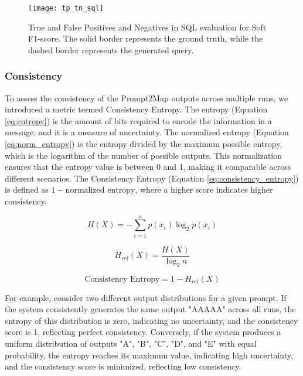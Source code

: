 \begin{figure}[htbp]
    \centering
    \texttt{[image: tp\_tn\_sql]}
    \caption{True and False Positives and Negatives in SQL evaluation for Soft F1-score. The solid border represents the ground truth, while the dashed border represents the generated query.}
    \label{fig:tp_tn_sql}
\end{figure}

\subsubsection{Consistency}

To assess the consistency of the Prompt2Map outputs across multiple runs, we introduced a metric termed Consistency Entropy. The entropy (Equation \ref{eq:entropy}) is the amount of bits required to encode the information in a message, and it is a measure of uncertainty. The normalized entropy (Equation \ref{eq:norm_entropy}) is the entropy divided by the maximum possible entropy, which is the logarithm of the number of possible outputs. This normalization ensures that the entropy value is between 0 and 1, making it comparable across different scenarios. The Consistency Entropy (Equation \ref{eq:consistency_entropy}) is defined as \(1 - \text{normalized entropy}\), where a higher score indicates higher consistency.

\begin{equation}
    H(X) = - \sum_{i=1}^{n} p(x_i) \log_2 p(x_i)
    \label{eq:entropy}
\end{equation}

\begin{equation}
    H_{rel}(X) = \frac{H(X)}{\log_2 n} 
    \label{eq:norm_entropy}
\end{equation}

\begin{equation}
    \text{Consistency Entropy} = 1 - H_{rel}(X)
    \label{eq:consistency_entropy}
\end{equation}



For example, consider two different output distributions for a given prompt. If the system consistently generates the same output "AAAAA" across all runs, the entropy of this distribution is zero, indicating no uncertainty, and the consistency score is 1, reflecting perfect consistency. Conversely, if the system produces a uniform distribution of outputs "A", "B", "C", "D", and "E" with equal probability, the entropy reaches its maximum value, indicating high uncertainty, and the consistency score is minimized, reflecting low consistency.

